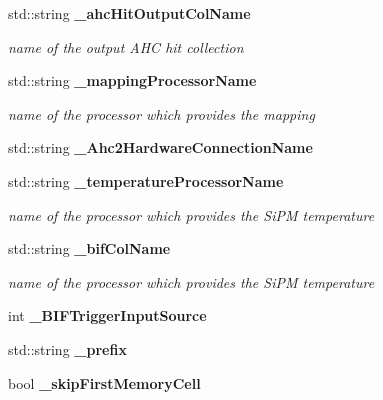 \begin{DoxyCompactItemize}
\item 
std\-::string {\bf \-\_\-ahc\-Hit\-Output\-Col\-Name}\label{classCALICE_1_1Ahc2OccupancyCalibrator_aa8fd9dbe672add06d67ab9d02c091738}

\begin{DoxyCompactList}\small\item\em name of the output A\-H\-C hit collection \end{DoxyCompactList}\item 
std\-::string {\bf \-\_\-mapping\-Processor\-Name}\label{classCALICE_1_1Ahc2OccupancyCalibrator_a36e578634b06a3bbfc1d1062b9e6c5ba}

\begin{DoxyCompactList}\small\item\em name of the processor which provides the mapping \end{DoxyCompactList}\item 
std\-::string {\bfseries \-\_\-\-Ahc2\-Hardware\-Connection\-Name}\label{classCALICE_1_1Ahc2OccupancyCalibrator_a653a9a2efd9f6b5d7c50afe550561870}

\item 
std\-::string {\bf \-\_\-temperature\-Processor\-Name}\label{classCALICE_1_1Ahc2OccupancyCalibrator_ad36670eaac520cd472476bfd0f3af00f}

\begin{DoxyCompactList}\small\item\em name of the processor which provides the Si\-P\-M temperature \end{DoxyCompactList}\item 
std\-::string {\bf \-\_\-bif\-Col\-Name}\label{classCALICE_1_1Ahc2OccupancyCalibrator_a346e6ef475334068a4400c80bf9daaef}

\begin{DoxyCompactList}\small\item\em name of the processor which provides the Si\-P\-M temperature \end{DoxyCompactList}\item 
int {\bfseries \-\_\-\-B\-I\-F\-Trigger\-Input\-Source}\label{classCALICE_1_1Ahc2OccupancyCalibrator_aad631504dc281bdd1e963ed0c324e260}

\item 
std\-::string {\bfseries \-\_\-prefix}\label{classCALICE_1_1Ahc2OccupancyCalibrator_ad82f4c256b53cd8a2990027afc57497a}

\item 
bool {\bfseries \-\_\-skip\-First\-Memory\-Cell}\label{classCALICE_1_1Ahc2OccupancyCalibrator_acff5130980088ebcee6c387a62dec589}


\end{DoxyCompactItemize}
